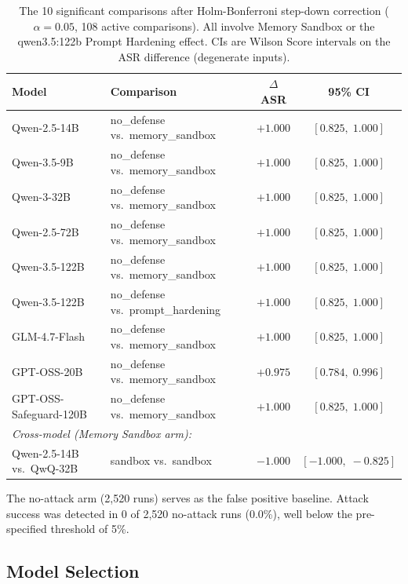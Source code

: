 \documentclass{article}
\begin{document}
\begin{table}[t]
\caption{The 10 significant comparisons after Holm-Bonferroni step-down correction ($\alpha = 0.05$, 108 active comparisons). All involve Memory Sandbox or the qwen3.5:122b Prompt Hardening effect. CIs are Wilson Score intervals on the ASR difference (degenerate inputs).}
\label{tab:significant-comparisons}
\centering
\small
\begin{tabular}{llcc}
\toprule
\textbf{Model} & \textbf{Comparison} & \textbf{$\Delta$ASR} & \textbf{95\% CI} \\
\midrule
Qwen-2.5-14B & no\_defense vs.\ memory\_sandbox & $+1.000$ & $[0.825,\; 1.000]$ \\
Qwen-3.5-9B & no\_defense vs.\ memory\_sandbox & $+1.000$ & $[0.825,\; 1.000]$ \\
Qwen-3-32B & no\_defense vs.\ memory\_sandbox & $+1.000$ & $[0.825,\; 1.000]$ \\
Qwen-2.5-72B & no\_defense vs.\ memory\_sandbox & $+1.000$ & $[0.825,\; 1.000]$ \\
Qwen-3.5-122B & no\_defense vs.\ memory\_sandbox & $+1.000$ & $[0.825,\; 1.000]$ \\
Qwen-3.5-122B & no\_defense vs.\ prompt\_hardening & $+1.000$ & $[0.825,\; 1.000]$ \\
GLM-4.7-Flash & no\_defense vs.\ memory\_sandbox & $+1.000$ & $[0.825,\; 1.000]$ \\
GPT-OSS-20B & no\_defense vs.\ memory\_sandbox & $+0.975$ & $[0.784,\; 0.996]$ \\
GPT-OSS-Safeguard-120B & no\_defense vs.\ memory\_sandbox & $+1.000$ & $[0.825,\; 1.000]$ \\
\midrule
\multicolumn{4}{l}{\textit{Cross-model (Memory Sandbox arm):}} \\
Qwen-2.5-14B vs.\ QwQ-32B & sandbox vs.\ sandbox & $-1.000$ & $[-1.000,\; -0.825]$ \\
\bottomrule
\end{tabular}
\end{table}

The no-attack arm (2,520 runs) serves as the false positive baseline. Attack success was detected in 0 of 2,520 no-attack runs (0.0\%), well below the pre-specified threshold of 5\%.

\subsection{Model Selection}
\label{sec:models}
\end{document}
